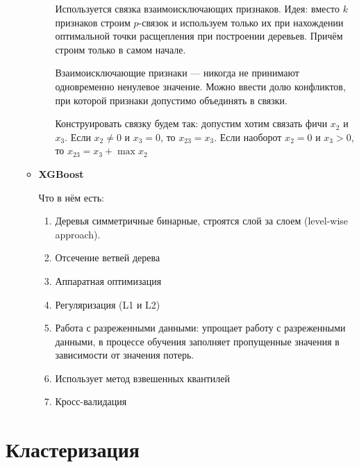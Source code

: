 \documentclass[12pt]{article}
\begin{document}
\begin{itemize}
\begin{itemize}
\begin{enumerate}
Используется связка взаимоисключающих признаков. Идея: вместо $k$ признаков строим $p$-связок и используем только их при нахождении оптимальной точки расщепления при построении деревьев.
Причём строим только в самом начале.

Взаимоисключающие признаки — никогда не принимают одновременно ненулевое значение. Можно ввести долю конфликтов, при которой признаки допустимо объединять в связки.

Конструировать связку будем так:
допустим хотим связать фичи $x_2$ и $x_3$.
Если $x_2 \neq 0$ и $x_3  = 0$, то $x_{23} = x_3$. Если наоборот $x_2 = 0$ и $x_3 > 0$, то $x_{23} = x_3 + \max x_2$
\end{enumerate}

\item \textbf{XGBoost}



Что в нём есть:

\begin{enumerate}

\item Деревья симметричные бинарные, строятся слой за слоем (level-wise approach).
\item Отсечение ветвей дерева
\item Аппаратная оптимизация
\item Регуляризация (L1 и L2)
\item Работа с разреженными данными: упрощает работу с разреженными данными, в процессе обучения заполняет пропущенные значения в зависимости от значения потерь. 
\item Использует метод взвешенных квантилей
\item Кросс-валидация
\end{enumerate}

\end{itemize}

\end{itemize}

\section*{Кластеризация}
\end{document}
